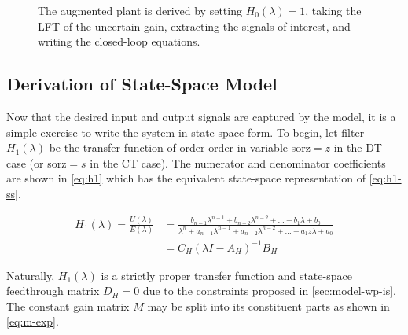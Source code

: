 \begin{figure}
	\caption{The augmented plant is derived by setting $H_0(\lambda) = 1$, taking the LFT of the uncertain gain, extracting the signals of interest, and writing the closed-loop equations.} \label{fig:sdm-aug}
\end{figure}

\subsection{Derivation of State-Space Model}

Now that the desired input and output signals are captured by the model, it is a simple exercise to write the system in state-space form. To begin, let filter $H_1(\lambda)$ be the transfer function of order \gls{order} in variable \gls{sorz}$ = z$ in the \gls{DT} case (or \gls{sorz}$ = s$ in the \gls{CT} case). The numerator and denominator coefficients are shown in \autoref{eq:h1} which has the equivalent state-space representation of \autoref{eq:h1-ss}.

\begin{align}
	H_1(\lambda) = \frac{U(\lambda)}{E(\lambda)} &= \frac{b_{n-1}\lambda^{n-1} + b_{n-2}\lambda^{n-2} + \ldots + b_1\lambda + b_0}{\lambda^n + a_{n-1}\lambda^{n-1} + a_{n-2}\lambda^{n-2} + \ldots + a_1z\lambda + a_0} \label{eq:h1} \\
	&= C_H(\lambda I - A_H)^{-1}B_H \label{eq:h1-ss}
\end{align}

Naturally, $H_1(\lambda)$ is a strictly proper transfer function and state-space feedthrough matrix $D_H = 0$ due to the constraints proposed in \autoref{sec:model-wp-is}. The constant gain matrix $M$ may be split into its constituent parts as shown in \autoref{eq:m-exp}.


